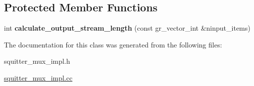 \subsection*{Protected Member Functions}
\begin{DoxyCompactItemize}
\item 
int {\bfseries calculate\+\_\+output\+\_\+stream\+\_\+length} (const gr\+\_\+vector\+\_\+int \&ninput\+\_\+items)\hypertarget{classgr_1_1squitter__select_1_1squitter__mux__impl_a68044c9738e049bf45daf21148c203ec}{}\label{classgr_1_1squitter__select_1_1squitter__mux__impl_a68044c9738e049bf45daf21148c203ec}

\end{DoxyCompactItemize}


The documentation for this class was generated from the following files\+:\begin{DoxyCompactItemize}
\item 
squitter\+\_\+mux\+\_\+impl.\+h\item 
\hyperlink{squitter__mux__impl_8cc}{squitter\+\_\+mux\+\_\+impl.\+cc}\end{DoxyCompactItemize}
